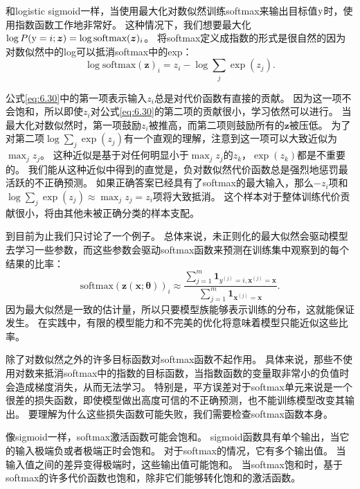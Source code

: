 和logistic sigmoid一样，当使用最大化对数似然训练softmax来输出目标值$\mathrm{y}$时，使用指数函数工作地非常好。
这种情况下，我们想要最大化$\log P(\mathrm{y} =i; \bm{z})=\log \text{softmax}(\bm{z})_i$。
将softmax定义成指数的形式是很自然的因为对数似然中的log可以抵消softmax中的exp：
\begin{equation}
\log \text{softmax}(\bm{z})_i = z_i - \log \sum_j \exp(z_j).
\label{eq:6.30}
\end{equation}


公式\ref{eq:6.30}中的第一项表示输入$z_i$总是对代价函数有直接的贡献。
因为这一项不会饱和，所以即使$z_i$对公式\ref{eq:6.30}的第二项的贡献很小，学习依然可以进行。
当最大化对数似然时，第一项鼓励$z_i$被推高，而第二项则鼓励所有的$\bm{z}$被压低。
为了对第二项$\log \sum_j \exp(z_j)$有一个直观的理解，注意到这一项可以大致近似为$\max_j z_j$。
这种近似是基于对任何明显小于$\max_j z_j$的$z_k$，$\exp(z_k)$都是不重要的。
我们能从这种近似中得到的直觉是，负对数似然代价函数总是强烈地惩罚最活跃的不正确预测。
如果正确答案已经具有了softmax的最大输入，那么$-z_i$项和$\log\sum_j \exp(z_j) \approx \max_j z_j = z_i$项将大致抵消。
这个样本对于整体训练代价贡献很小，将由其他未被正确分类的样本支配。

到目前为止我们只讨论了一个例子。
总体来说，未正则化的最大似然会驱动模型去学习一些参数，而这些参数会驱动softmax函数来预测在训练集中观察到的每个结果的比率：
\begin{equation}
\text{softmax}(\bm{z}(\bm{x}; \bm{\theta}))_i \approx \frac{\sum_{j=1}^m \bm{1}_{y^{(j)}=i, \bm{x}^{(j)} = \bm{x}}  }{ \sum_{j=1}^{m} \bm{1}_{\bm{x}^{(j)} = \bm{x}} }.
\end{equation}
因为最大似然是一致的估计量，所以只要模型族能够表示训练的分布，这就能保证发生。
在实践中，有限的模型能力和不完美的优化将意味着模型只能近似这些比率。

除了对数似然之外的许多目标函数对softmax函数不起作用。
具体来说，那些不使用对数来抵消softmax中的指数的目标函数，当指数函数的变量取非常小的负值时会造成梯度消失，从而无法学习。
特别是，平方误差对于softmax单元来说是一个很差的损失函数，即使模型做出高度可信的不正确预测，也不能训练模型改变其输出\citep{Bridle90}。
要理解为什么这些损失函数可能失败，我们需要检查softmax函数本身。

像sigmoid一样，softmax激活函数可能会饱和。
sigmoid函数具有单个输出，当它的输入极端负或者极端正时会饱和。
对于softmax的情况，它有多个输出值。
当输入值之间的差异变得极端时，这些输出值可能饱和。
当softmax饱和时，基于softmax的许多代价函数也饱和，除非它们能够转化饱和的激活函数。

